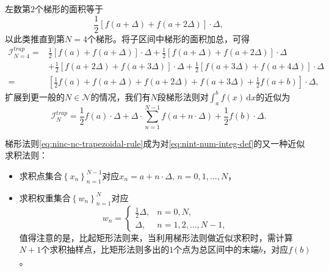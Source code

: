 左数第$2$个梯形的面积等于
\begin{equation*}
  \frac{1}{2} \left[ f \left( a + \Delta \right) + f \left( a + 2 \Delta \right) \right] \cdot \Delta,
\end{equation*}
以此类推直到第$N=4$个梯形。将子区间中梯形的面积加总，可得
\begin{equation*}
\begin{split}
  \mathcal{I}_{N=4}^{trap} = &
    \frac{1}{2} \left[ f \left( a \right) + f \left( a + \Delta \right) \right] \cdot \Delta
    + \frac{1}{2} \left[ f \left( a + \Delta \right) + f \left( a + 2 \Delta \right) \right] \cdot \Delta \\
    & + \frac{1}{2} \left[ f \left( a + 2 \Delta \right) + f \left( a + 3 \Delta \right) \right] \cdot \Delta
    + \frac{1}{2} \left[ f \left( a + 3 \Delta \right) + f \left( a + 4 \Delta \right) \right] \cdot \Delta \\
    = & \left[
    \frac{1}{2} f \left( a \right)
    + f \left( a + \Delta \right)
    + f \left( a + 2 \Delta \right)
    + f \left( a + 3 \Delta \right)
    + \frac{1}{2} f \left( a + b \right)
    \right] \cdot \Delta,
\end{split}
\end{equation*}
扩展到更一般的$N \in \mathcal{N}$的情况，我们有$N$段梯形法则对$\int_{a}^{b} f \left( x \right) \, \mathrm{d} x$的近似为
\begin{equation}
  \label{eq:ninc-nc-trapezoidal-rule}
  \mathcal{I}_{N}^{trap} = \frac{1}{2} f \left( a \right) \cdot \Delta
  + \Delta \cdot \sum_{n=1}^{N-1} f \left( a + n \cdot \Delta \right)
  + \frac{1}{2} f \left( b \right) \cdot \Delta.
\end{equation}


梯形法则\eqref{eq:ninc-nc-trapezoidal-rule}成为对\eqref{eq:nint-num-integ-def}的又一种近似求积法则：
\begin{itemize}
  \item 求积点集合$\left\{ x_{n} \right\}_{n=1}^{N-1}$对应$x_{n} = a + n \cdot \Delta, \, n = 0,1,\ldots,N$，
  \item 求积权重集合$\left\{ w_{n} \right\}_{n=1}^{N}$对应
  \begin{equation*}
  w_{n} =
  \begin{cases}
  \frac{1}{2} \Delta, & n = 0, N, \\
  \Delta, & n = 1, 2, \ldots, N-1,
  \end{cases}
\end{equation*}
值得注意的是，比起矩形法则来，当利用梯形法则做近似求积时，需计算$N+1$个求积抽样点，比矩形法则多出的$1$个点为总区间中的末端$b$，对应$f(b)$。
\end{itemize}

